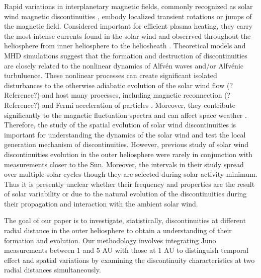 \documentclass[
]{agujournal2019}
\begin{document}
Rapid variations in interplanetary magnetic fields, commonly recognized as solar wind magnetic discontinuities \citep{colburnDiscontinuitiesSolarWind1966}, embody localized transient rotations or jumps of the magnetic field. Considered important for efficient plasma heating, they carry the most intense currents found in the solar wind and obserrved throughout the heliosphere from inner heliosphere \citep{liuCategorizingMHDDiscontinuities2022} to the heliosheath \citep{burlagaCurrentSheetsHeliosheath2011}. Theoretical models \citep[\citet{medvedevDissipativeDynamicsCollisionless1997}]{lerchePropagationMagneticDisturbances1975} and MHD simulations \citep[\citet{grecoStatisticalAnalysisDiscontinuities2009}, \citet{yangFormationRotationalDiscontinuities2015}]{grecoIntermittentMHDStructures2008} suggest that the formation and destruction of discontinuities are closely related to the nonlinear dynamics of Alfvén waves and/or Alfvénic turbuluence. These nonlinear processes can create significant isolated disturbances to the otherwise adiabatic evolution of the solar wind flow (?Reference?) and host many processes, including magnetic reconnection (?Reference?) and Fermi acceleration of particles \citep{wentzelMotionMagneticDiscontinuities1964}. Moreover, they contribute significantly to the magnetic fluctuation spectra \citep{borovskyContributionStrongDiscontinuities2010} and can affect space weather \citep{tsurutaniReviewInterplanetaryDiscontinuities2011}. Therefore, the study of the spatial evolution of solar wind discontinuities is important for understanding the dynamics of the solar wind and test the local generation mechanism of discontinuities. However, previous study of solar wind discontinuities evolution \citep{sodingRadialLatitudinalDependencies2001} in the outer heliosphere were rarely in conjunction with measurements closer to the Sun. Moreover, the intervals in their study spread over multiple solar cycles though they are selected during solar activity minimum. Thus it is presently unclear whether their frequency and properties are the result of solar variability or due to the natural evolution of the discontinuities during their propagation and interaction with the ambient solar wind.

The goal of our paper is to investigate, statistically, discontinuities at different radial distance in the outer heliosphere to obtain a understanding of their formation and evolution. Our methodology involves integrating Juno measurements \citep{connerneyJunoMagneticField2017} between \(1\) and \(5\) AU with those at \(1\) AU to distinguish temporal effect and spatial variations by examining the discontinuity characteristics at two radial distances simultaneously.
\end{document}
